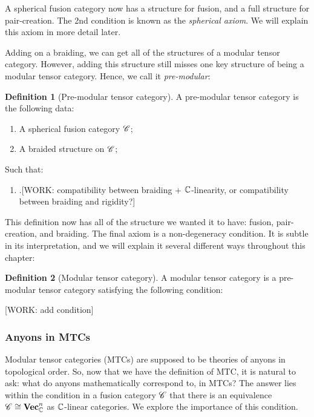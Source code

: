\documentclass{article}
\theoremstyle{definition}
\newtheorem*{definition}{Definition}
\numberwithin{figure}{section}
\begin{document}
A spherical fusion category now has a structure for fusion, and a full structure for pair-creation. The 2nd condition is known as the \textit{spherical axiom}. We will explain this axiom in more detail later.

Adding on a braiding, we can get all of the structures of a modular tensor category. However, adding this structure still misses one key structure of being a modular tensor category. Hence, we call it \textit{pre-modular}:

\begin{definition}[Pre-modular tensor category] A pre-modular tensor category is the following data:

\begin{enumerate}
\item A spherical fusion category $\mathscr{C}$;
\item A braided structure on $\mathscr{C}$;
\end{enumerate}

Such that:

\begin{enumerate}
\item .[WORK: compatibility between braiding + $\mathbb{C}$-linearity, or compatibility between braiding and rigidity?]
\end{enumerate}

\raggedleft\qedsymbol{}
\end{definition}

This definition now has all of the structure we wanted it to have: fusion, pair-creation, and braiding. The final axiom is a non-degeneracy condition. It is subtle in its interpretation, and we will explain it several different ways throughout this chapter:


\begin{definition}[Modular tensor category] A modular tensor category is a pre-modular tensor category satisfying the following condition:

[WORK: add condition]

\raggedleft\qedsymbol{}
\end{definition}


\subsubsection{Anyons in MTCs}

Modular tensor categories (MTCs) are supposed to be theories of anyons in topological order. So, now that we have the definition of MTC, it is natural to ask: what do anyons mathematically correspond to, in MTCs? The answer lies within the condition in a fusion category $\mathscr{C}$ that there is an equivalence $\mathscr{C}\cong \mathbf{Vec}_{\mathbb{C}}^n$ as $\mathbb{C}$-linear categories. We explore the importance of this condition.
\end{document}
